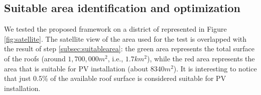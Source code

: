 

\subsection{Suitable area identification and optimization}
We tested the proposed framework on a district of   represented in Figure \ref{fig:satellite}. The satellite view of the area used for the test is overlapped with the result of step \ref{subsec:suitablearea}: the green area represents the total surface of the roofs (around $1,700,000m^2$, i.e., $1.7km^2$), while the red area represents the area that is suitable for PV installation (about $8340m^2$). It is interesting to notice that just 0.5\% of the available roof surface is considered suitable for PV installation.  %
 
